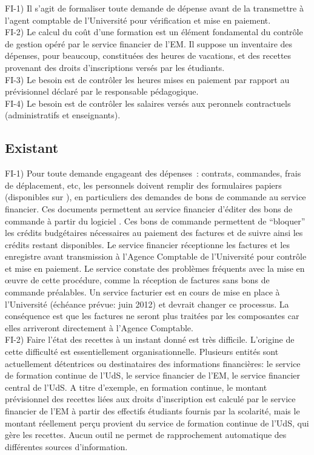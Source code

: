 \documentclass{book}
\begin{document}
\bigskip
FI-1) Il s'agit de formaliser toute demande de dépense avant de la transmettre
à l'agent comptable de l'Université pour vérification et mise en paiement. \\

FI-2) Le calcul du coût d'une formation est un élément fondamental du contrôle
de gestion opéré par le service financier de l'EM. Il suppose un inventaire
des dépenses, pour beaucoup, constituées des heures de vacations, et des recettes
provenant des droits d'inscriptions versés par les étudiants. \\

FI-3) Le besoin est de contrôler les heures mises en paiement par rapport
au prévisionnel déclaré par le responsable pédagogique.\\

FI-4) Le besoin est de contrôler les salaires versés aux peronnels contractuels
(administratifs et enseignants).\\


\subsection{Existant}

FI-1) Pour toute demande engageant des dépenses~: contrats, commandes, frais 
de déplacement, etc, les personnels doivent remplir des formulaires papiers 
(disponibles sur ), en particuliers des demandes de bons de commande 
au service financier. Ces documents permettent au service financier d'éditer 
des bons de commande à partir du logiciel . Ces bons de commande 
permettent de ``bloquer'' les crédits budgétaires nécessaires au paiement des 
factures et de suivre ainsi les crédits restant disponibles. Le service financier
réceptionne les factures et les enregistre avant transmission à l'Agence
Comptable de l'Université pour contrôle et mise en paiement.
Le service constate des problèmes fréquents avec la mise en {\oe}uvre de cette
procédure, comme la réception de factures sans bons de commande préalables.
Un service facturier est en cours de mise en place à l'Université (échéance
prévue: juin 2012) et devrait changer ce processus. La conséquence est que
les factures ne seront plus traitées par les composantes car elles arriveront
directement à l'Agence Comptable.\\

FI-2) Faire l'état des recettes à un instant donné est très difficile. L'origine
de cette difficulté est essentiellement organisationnelle. Plusieurs entités sont
actuellement détentrices ou destinataires des informations financières:
le service de formation continue de l'UdS, le service financier de l'EM,
le service financier central de l'UdS. A titre d'exemple, en formation continue, 
le montant prévisionnel des recettes liées aux droits d'inscription est calculé 
par le service financier de l'EM à partir des effectifs étudiants fournis par la
scolarité, mais le montant réellement perçu provient du service de formation 
continue de l'UdS, qui gère les recettes. Aucun outil ne permet de rapprochement 
automatique des différentes sources d'information.
\end{document}
